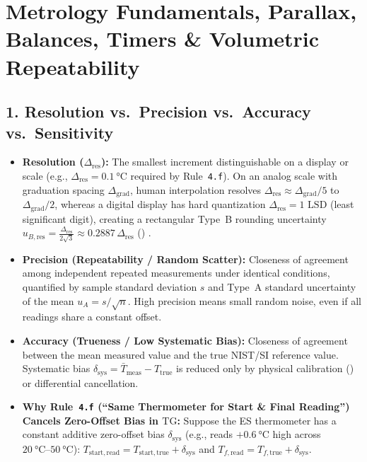 \section{Metrology Fundamentals, Parallax, Balances, Timers \& Volumetric Repeatability}\label{sec:17.2}

\subsection{1. Resolution vs.\ Precision vs.\ Accuracy vs.\ Sensitivity}
\begin{itemize}
  \item \textbf{Resolution ($\Delta_{\mathrm{res}}$):} The smallest increment distinguishable on a display or scale (e.g., $\Delta_{\mathrm{res}} = \SI{0.1}{\celsius}$ required by Rule~\texttt{4.f}). On an analog scale with graduation spacing $\Delta_{\mathrm{grad}}$, human interpolation resolves $\Delta_{\mathrm{res}} \approx \Delta_{\mathrm{grad}}/5$ to $\Delta_{\mathrm{grad}}/2$, whereas a digital display has hard quantization $\Delta_{\mathrm{res}} = 1\text{ LSD}$ (least significant digit), creating a rectangular Type~B rounding uncertainty $u_{B,\mathrm{res}} = \frac{\Delta_{\mathrm{res}}}{2\sqrt{3}} \approx 0.2887\,\Delta_{\mathrm{res}}$ () .
  \item \textbf{Precision (Repeatability / Random Scatter):} Closeness of agreement among independent repeated measurements under identical conditions, quantified by sample standard deviation $s$ and Type~A standard uncertainty of the mean $u_A = s/\sqrt{n}$. High precision means small random noise, even if all readings share a constant offset.
  \item \textbf{Accuracy (Trueness / Low Systematic Bias):} Closeness of agreement between the mean measured value and the true NIST/SI reference value. Systematic bias $\delta_{\mathrm{sys}} = \bar{T}_{\mathrm{meas}} - T_{\mathrm{true}}$ is reduced only by physical calibration () or differential cancellation.
  \item \textbf{Why Rule~\texttt{4.f} (``Same Thermometer for Start \& Final Reading'') Cancels Zero-Offset Bias in $\mathrm{TG}$:} 
  Suppose the ES thermometer has a constant additive zero-offset bias $\delta_{\mathrm{sys}}$ (e.g., reads $+\SI{0.6}{\celsius}$ high across $\SIrange{20}{50}{\celsius}$): $T_{\mathrm{start,read}} = T_{\mathrm{start,true}} + \delta_{\mathrm{sys}}$ and $T_{f,\mathrm{read}} = T_{f,\mathrm{true}} + \delta_{\mathrm{sys}}$.

\end{itemize}
